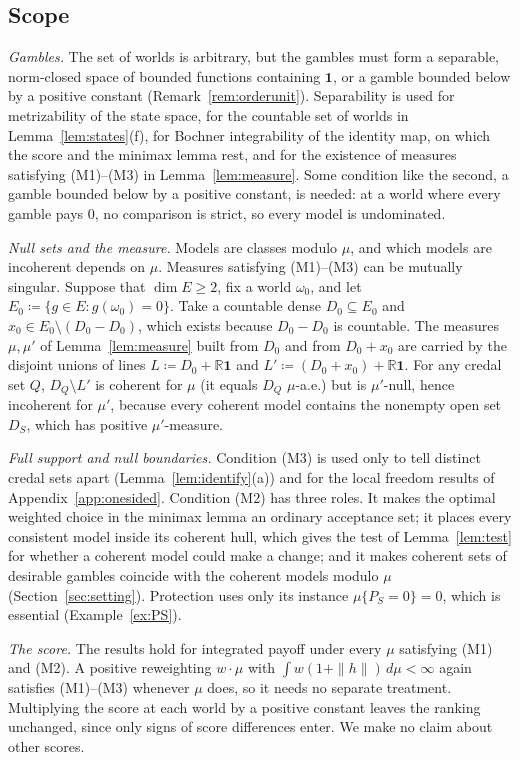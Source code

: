 \documentclass[11pt]{article}
\newcommand{\R}{\mathbb{R}}
\newcommand{\one}{\mathbf{1}}
\theoremstyle{plain}
\theoremstyle{definition}
\theoremstyle{remark}
\begin{document}
\subsection{Scope}

\emph{Gambles.} The set of worlds is arbitrary, but the gambles must form a separable,
norm-closed space of bounded functions containing $\one$, or a gamble bounded below by a
positive constant (Remark~\ref{rem:orderunit}). Separability is used for metrizability of the
state space, for the countable set of worlds in Lemma~\ref{lem:states}(f), for Bochner
integrability of the identity map, on which the score and the minimax lemma rest, and for the
existence of measures satisfying (M1)--(M3) in Lemma~\ref{lem:measure}. Some condition like
the second, a gamble bounded below by a positive constant, is needed: at a world where every gamble pays $0$, no comparison is strict, so every
model is undominated.

\emph{Null sets and the measure.} Models are classes modulo $\mu$, and which models are
incoherent depends on $\mu$. Measures satisfying (M1)--(M3) can be mutually singular. Suppose
that $\dim E\ge2$, fix a world $\omega_0$, and let $E_0\coloneqq\{g\in E:g(\omega_0)=0\}$. Take a
countable dense $D_0\subseteq E_0$ and $x_0\in E_0\setminus(D_0-D_0)$, which exists because
$D_0-D_0$ is countable. The measures $\mu,\mu'$ of Lemma~\ref{lem:measure} built from $D_0$
and from $D_0+x_0$ are carried by the disjoint unions of lines $L\coloneqq D_0+\R\one$ and
$L'\coloneqq(D_0+x_0)+\R\one$. For any credal set $Q$, $D_Q\setminus L'$ is coherent for $\mu$
(it equals $D_Q$ $\mu$-a.e.) but is $\mu'$-null, hence incoherent for $\mu'$, because every
coherent model contains the nonempty open set $D_S$, which has positive $\mu'$-measure.

\emph{Full support and null boundaries.} Condition (M3) is used only to tell distinct credal
sets apart (Lemma~\ref{lem:identify}(a)) and for the local freedom results of
Appendix~\ref{app:onesided}. Condition (M2) has three roles. It makes the optimal weighted
choice in the minimax lemma an ordinary acceptance set; it places every consistent model inside
its coherent hull, which gives the test of Lemma~\ref{lem:test} for whether a coherent model could
make a change; and it makes coherent sets of desirable gambles coincide with the coherent models
modulo $\mu$ (Section~\ref{sec:setting}). Protection uses only its instance $\mu\{P_S=0\}=0$,
which is essential (Example~\ref{ex:PS}).

\emph{The score.} The results hold for integrated payoff under every $\mu$ satisfying (M1) and
(M2). A positive reweighting $w\cdot\mu$ with $\int w(1+\|h\|)\,d\mu<\infty$ again satisfies
(M1)--(M3) whenever $\mu$ does, so it needs no separate treatment. Multiplying the score at each
world by a positive constant leaves the ranking unchanged, since only signs of score differences
enter. We make no claim about other scores.
\end{document}
